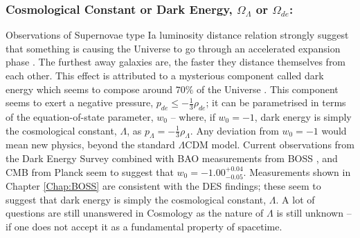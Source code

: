 \subsubsection{Cosmological Constant or Dark Energy, $\Omega_{\Lambda}$ or $\Omega_{de}$:}
Observations of Supernovae type Ia luminosity distance relation strongly suggest that something is causing the Universe to go through an accelerated expansion phase \citep{1998Riess,1999Perlmutter,2018LambdaCentury}. The furthest away galaxies are, the faster they distance themselves from each other. This effect is attributed to a mysterious component called dark energy which seems to compose around $70\%$ of the Universe \citep{2018PlanckCosmology}. This component seems to exert a negative pressure, $p_{de} \leq - \frac{1}{3}\rho_{de}$; it can be parametrised in terms of the equation-of-state parameter, $w_0$ -- where, if $w_0 = -1$, dark energy is simply the cosmological constant, $\Lambda$, as $p_{\Lambda}= -\frac{1}{3}\rho_{\Lambda}$. Any deviation from $w_0 = -1$ would mean new physics, beyond the standard $\Lambda$CDM model. Current observations from the Dark Energy Survey combined with BAO measurements from BOSS \citep{2016BOSSCosmology}, and CMB from Planck \citep{PlanckCosmology2016} seem to suggest that $w_0 = -1.00^{+0.04}_{-0.05}$. Measurements shown in Chapter \ref{Chap:BOSS} are consistent with the DES findings; these seem to suggest that dark energy is simply the cosmological constant, $\Lambda$. A lot of questions are still unanswered in Cosmology as the nature of $\Lambda$ is still unknown -- if one does not accept it as a fundamental property of spacetime.

